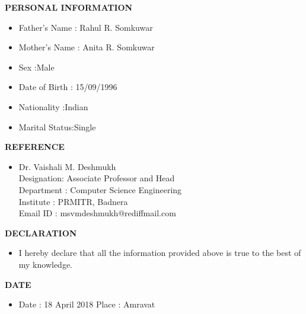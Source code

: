 \documentclass[a4paper,20pt]{article}
\begin{document}
\textbf{\large {PERSONAL INFORMATION }}
\begin{itemize}

		\item \noindent Father’s Name : Rahul R. Somkuwar
		\item \noindent Mother’s Name : Anita R. Somkuwar
		\item \noindent Sex :Male 
	 	\item\noindent Date of Birth : 15/09/1996
		\item \noindent Nationality :Indian 
	 	\item\noindent Marital Status:Single
	 
\indent
\end{itemize}

\textbf{\large {REFERENCE} }
\begin{itemize}
	\item 	
	Dr. Vaishali M. Deshmukh \\
	Designation: Associate Professor and Head\\
	Department : Computer Science Engineering\\
	Institute  : PRMITR, Badnera	\\
	Email ID   : msvmdeshmukh@rediffmail.com
	\newline
\end{itemize}

\textbf{\large {DECLARATION} }
\begin{itemize}
 \item[] \noindent I hereby declare that all the information provided above is true to the best of my knowledge.
\newline
\end{itemize}

\textbf{\large {DATE} }
\begin{itemize}	
	\item[]
 Date : 18 April 2018	
	\newline	 Place : Amravat
		
\end{itemize}
\end{document}
